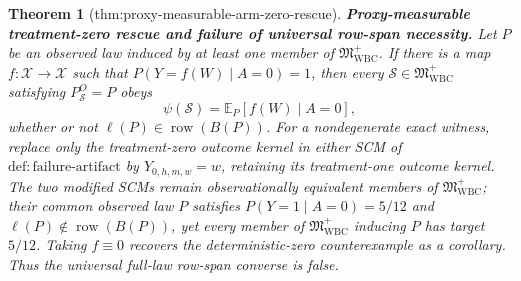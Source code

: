 \documentclass{article}
\newtheorem{theorem}{Theorem}
\begin{document}
\begin{theorem}[thm:proxy-measurable-arm-zero-rescue]\label{thm:proxy-measurable-arm-zero-rescue}
\textbf{Proxy-measurable treatment-zero rescue and failure of universal row-span necessity.} Let \(P\) be an observed law induced by at least one member of \(\mathfrak M_{\mathrm{WBC}}^{+}\). If there is a map \(f:\mathcal X\to\mathcal X\) such that \(P(Y=f(W)\mid A=0)=1\), then every \(\mathcal S\in\mathfrak M_{\mathrm{WBC}}^{+}\) satisfying \(P_{\mathcal S}^O=P\) obeys
\[
\psi(\mathcal S)=\mathbb E_P[f(W)\mid A=0],
\]
whether or not \(\ell(P)\in\operatorname{row}(B(P))\). For a nondegenerate exact witness, replace only the treatment-zero outcome kernel in either SCM of \(\mathrm{def{:}failure\text{-}artifact}\) by \(Y_{0,h,m,w}=w\), retaining its treatment-one outcome kernel. The two modified SCMs remain observationally equivalent members of \(\mathfrak M_{\mathrm{WBC}}^{+}\); their common observed law \(P\) satisfies \(P(Y=1\mid A=0)=5/12\) and \(\ell(P)\notin\operatorname{row}(B(P))\), yet every member of \(\mathfrak M_{\mathrm{WBC}}^{+}\) inducing \(P\) has target \(5/12\). Taking \(f\equiv0\) recovers the deterministic-zero counterexample as a corollary. Thus the universal full-law row-span converse is false.
\end{theorem}
\end{document}
